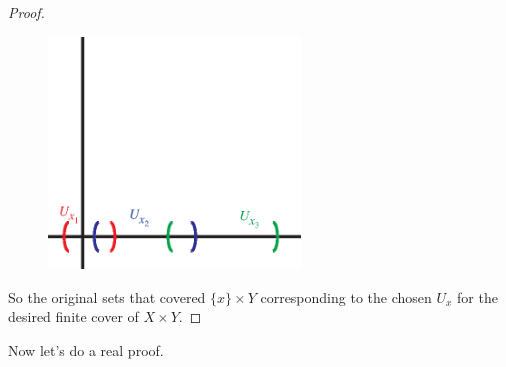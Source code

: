 \begin{proof}
\begin{figure}
\begin{center}
{			\includegraphics[width=190pt]{images/compactness/tychonoff_comic_4}} 
		\end{center}
	\end{figure}
	
	So the original sets that covered $\{x\} \times Y$ corresponding to the chosen $U_x$ for the desired finite cover of $X \times Y$. 
\end{proof}
Now let's do a real proof. 
